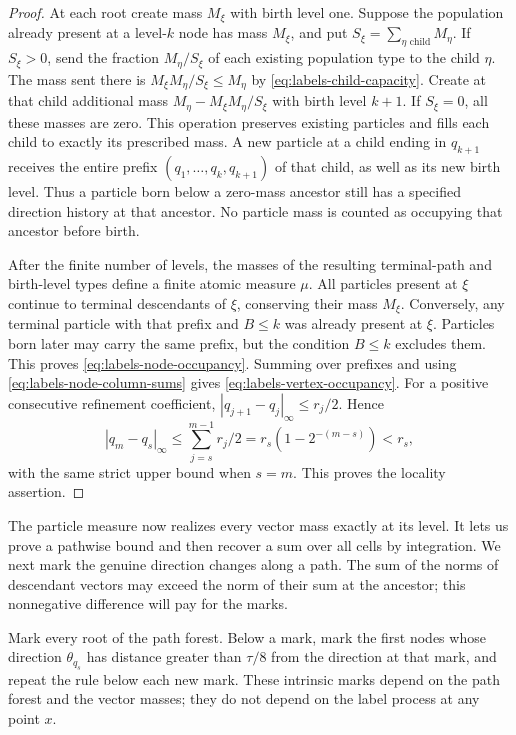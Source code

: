 \begin{proof}
At each root create mass $M_\xi$ with birth level one. Suppose the population
already present at a level-$k$ node has mass $M_\xi$, and put
$S_\xi=\sum_{\eta\text{ child}}M_\eta$. If $S_\xi>0$, send the fraction
$M_\eta/S_\xi$ of each existing population type to the child $\eta$.
The mass sent there is $M_\xi M_\eta/S_\xi\le M_\eta$ by
\eqref{eq:labels-child-capacity}. Create at that child additional mass
$M_\eta-M_\xi M_\eta/S_\xi$ with birth level $k+1$. If $S_\xi=0$, all
these masses are zero. This operation preserves existing particles and
fills each child to exactly its prescribed mass. A new particle at a
child ending in $q_{k+1}$ receives the entire
prefix $(q_1,\ldots,q_k,q_{k+1})$ of that child, as well as its new
birth level. Thus a particle born below a zero-mass ancestor still
has a specified direction history at that ancestor. No particle
mass is counted as occupying that ancestor before birth.

After the finite number of levels, the masses of the resulting
terminal-path and birth-level types define a finite atomic measure
$\mu$. All particles present at $\xi$ continue to terminal descendants
of $\xi$, conserving their mass $M_\xi$. Conversely, any terminal
particle with that prefix and $B\le k$ was already present at $\xi$.
Particles born later may carry the same prefix, but the condition
$B\le k$ excludes them. This proves \eqref{eq:labels-node-occupancy}.
Summing over prefixes and using \eqref{eq:labels-node-column-sums} gives
\eqref{eq:labels-vertex-occupancy}.
For a positive consecutive refinement coefficient,
$|q_{j+1}-q_j|_{\infty}\le r_j/2$. Hence
\[
 |q_m-q_s|_{\infty}
 \le\sum_{j=s}^{m-1}r_j/2
 =r_s(1-2^{-(m-s)})<r_s,
\]
with the same strict upper bound when $s=m$. This proves the locality
assertion.
\end{proof}

The particle measure now realizes every vector mass exactly at its
level. It lets us prove a pathwise bound and then recover a sum over
all cells by integration. We next mark the genuine direction changes
along a path. The sum of the norms of descendant vectors may exceed
the norm of their sum at the ancestor; this nonnegative difference
will pay for the marks.

Mark every root of the path forest. Below a mark, mark the first nodes
whose direction $\theta_{q_s}$ has distance greater than $\tau/8$ from
the direction at that mark, and repeat the rule below each new mark.
These intrinsic marks depend on the path forest and the vector masses;
they do not depend on the label process at any point $x$.

